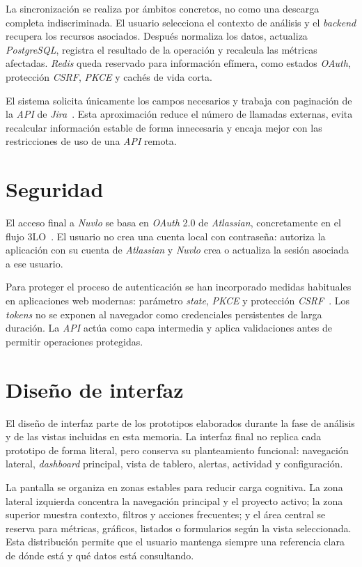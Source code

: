 La sincronización se realiza por ámbitos concretos, no como una descarga completa indiscriminada. El usuario selecciona el contexto de análisis y el \textit{backend} recupera los recursos asociados. Después normaliza los datos, actualiza \textit{PostgreSQL}, registra el resultado de la operación y recalcula las métricas afectadas. \textit{Redis} queda reservado para información efímera, como estados \textit{OAuth}, protección \textit{CSRF}, \textit{PKCE} y cachés de vida corta.

El sistema solicita únicamente los campos necesarios y trabaja con paginación de la \textit{API} de \textit{Jira}~\cite{AtlassianJiraRestV3,AtlassianJiraIssuesApi}. Esta aproximación reduce el número de llamadas externas, evita recalcular información estable de forma innecesaria y encaja mejor con las restricciones de uso de una \textit{API} remota.

\section{Seguridad}

El acceso final a \textit{Nuvlo} se basa en \textit{OAuth} 2.0 de \textit{Atlassian}, concretamente en el flujo 3LO~\cite{AtlassianOAuth3LO}. El usuario no crea una cuenta local con contraseña: autoriza la aplicación con su cuenta de \textit{Atlassian} y \textit{Nuvlo} crea o actualiza la sesión asociada a ese usuario.

Para proteger el proceso de autenticación se han incorporado medidas habituales en aplicaciones web modernas: parámetro \textit{state}, \textit{PKCE} y protección \textit{CSRF}~\cite{OWASPOAuth2,OWASPCSRF}. Los \textit{tokens} no se exponen al navegador como credenciales persistentes de larga duración. La \textit{API} actúa como capa intermedia y aplica validaciones antes de permitir operaciones protegidas.


\section{Diseño de interfaz}

El diseño de interfaz parte de los prototipos elaborados durante la fase de análisis y de las vistas incluidas en esta memoria. La interfaz final no replica cada prototipo de forma literal, pero conserva su planteamiento funcional: navegación lateral, \textit{dashboard} principal, vista de tablero, alertas, actividad y configuración.

La pantalla se organiza en zonas estables para reducir carga cognitiva. La zona lateral izquierda concentra la navegación principal y el proyecto activo; la zona superior muestra contexto, filtros y acciones frecuentes; y el área central se reserva para métricas, gráficos, listados o formularios según la vista seleccionada. Esta distribución permite que el usuario mantenga siempre una referencia clara de dónde está y qué datos está consultando.

